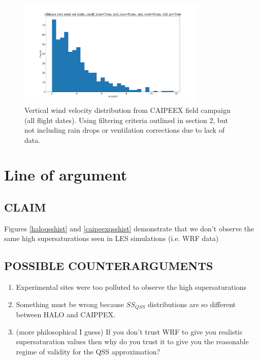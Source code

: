 \documentclass{article}
\begin{document}
\begin{figure}[ht]
    \centering
    \includegraphics[width=9cm]{revcaipeex/v10_w_hist_alldates_figure.png}
    \caption{Vertical wind velocity distribution from CAIPEEX field campaign (all flight dates). Using filtering criteria outlined in section 2, but not including rain drops or ventilation corrections due to lack of data.}
    \label{caipeexwhist}
\end{figure}

\clearpage
\newpage

\section{Line of argument}
\subsection{CLAIM}
Figures \ref{haloqsshist} and \ref{caipeexqsshist} demonstrate that we don't observe the same high supersaturations seen in LES simulations (i.e. WRF data) 
\subsection{POSSIBLE COUNTERARGUMENTS}
\begin{enumerate}
	\item Experimental sites were too polluted to observe the high supersaturations
	\item Something must be wrong because $SS_{QSS}$ distributions are so different between HALO and CAIPPEX.
	\item (more philosophical I guess) If you don't trust WRF to give you realistic supersaturation values then why do you trust it to give you the reasonable regime of validity for the QSS approximation?
\end{enumerate}
\end{document}
